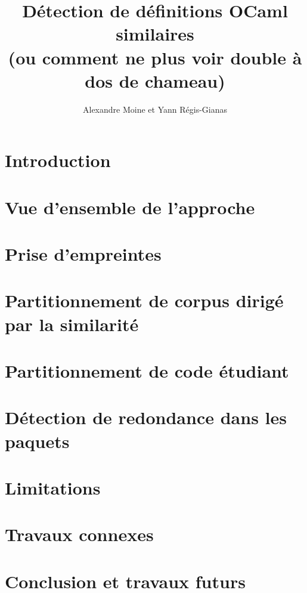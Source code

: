 \documentclass[a4paper]{easychair}
\title{Détection de définitions OCaml similaires \\
(ou comment ne plus voir double à dos de chameau)}
\author{Alexandre Moine et Yann Régis-Gianas}
\institute{
Université de Paris (UMR-CNRS 7126) - INRIA PI.R2
}
\begin{document}
\maketitle

\begin{abstract}

\end{abstract}

\section{Introduction}


\section{Vue d'ensemble de l'approche}
\label{sec:overview}


\section{Prise d'empreintes}
\label{sec:hash}


\section{Partitionnement de corpus dirigé par la similarité}
\label{sec:clustering}


\section{Partitionnement de code étudiant}
\label{sec:partition}


\section{Détection de redondance dans les paquets {\Opam}}
\label{sec:redundancy}


\section{Limitations}
\label{sec:limitations}


\section{Travaux connexes}
\label{sec:related-work}


\section{Conclusion et travaux futurs}
\label{sec:conclusion}




\end{document}
